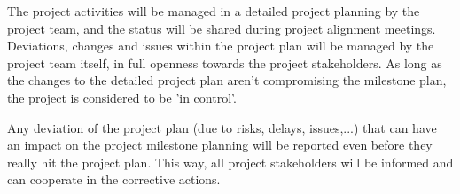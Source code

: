 The project activities will be managed in a detailed project planning by the project team, and the status will be shared during project alignment meetings.
Deviations, changes and issues within the project plan will be managed by the project team itself, in full openness towards the project stakeholders. 
As long as the changes to the detailed project plan aren't  compromising the milestone plan, the project is considered to be 'in control'. 

Any deviation of the project plan (due to risks, delays, issues,...) that can have an impact on the project milestone planning will be reported even before they really hit the project plan. 
This way, all project stakeholders will be informed and can cooperate in the corrective actions.




